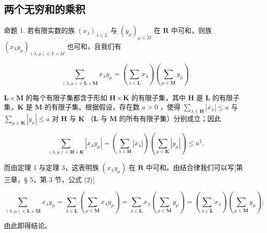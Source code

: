 \subsection{两个无穷和的乘积}

命题 1. 若有限实数的族 \((x_{\lambda})_{\lambda \in L}\) 与 \((y_{\mu})_{\mu \in M}\) 在 \(\mathbf{R}\) 中可和，则族 \((x_{\lambda}y_{\mu})_{(\lambda ,\mu)\in L\times M}\) 也可和，且我们有

\[
\sum_ {(\lambda , \mu) \in \mathbf {L} \times \mathbf {M}} x _ {\lambda} y _ {\mu} = (\sum_ {\lambda \in \mathbf {L}} x _ {\lambda}) (\sum_ {\mu \in \mathbf {M}} y _ {\mu}).\tag{1}
\]

\(\mathbf{L} \times \mathbf{M}\) 的每个有限子集都含于形如 \(\mathbf{H} \times \mathbf{K}\) 的有限子集，其中 \(\mathbf{H}\) 是 \(\mathbf{L}\) 的有限子集，\(\mathbf{K}\) 是 \(\mathbf{M}\) 的有限子集。根据假设，存在数 \(a > 0\) ，使得 \(\sum_{\lambda \in \mathbf{H}} |x_{\lambda}| \leqslant a\) 与 \(\sum_{\mu \in \mathbf{K}} |y_{\mu}| \leqslant a\) 对 \(\mathbf{H}\) 与 \(\mathbf{K}\) （\(\mathbf{L}\) 与 \(\mathbf{M}\) 的所有有限子集）分别成立；因此

\[
\sum_ {(\lambda , \mu) \in \mathbf {H} \times \mathbf {K}} | x _ {\lambda} y _ {\mu} | = (\sum_ {\lambda \in \mathbf {H}} | x _ {\lambda} |) (\sum_ {\mu \in \mathbf {K}} | y _ {\mu} |) \leqslant a ^ {2},
\]

而由定理 1 与定理 3，这表明族 \((x_{\lambda}y_{\mu})\) 在 \(\mathbf{R}\) 中可和。由结合律我们可以写{[}第三章，§ 5，第 3 节，公式 (2){]}

\[
\sum_ {(\lambda , \mu) \in \mathbf {L} \times \mathbf {M}} x _ {\lambda} y _ {\mu} = \sum_ {\lambda \in \mathbf {L}} (\sum_ {\mu \in \mathbf {M}} x _ {\lambda} y _ {\mu}) = \sum_ {\lambda \in \mathbf {L}} x _ {\lambda} (\sum_ {\mu \in \mathbf {M}} y _ {\mu}) = (\sum_ {\lambda \in \mathbf {L}} x _ {\lambda}) (\sum_ {\mu \in \mathbf {M}} y _ {\mu});
\]

由此即得结论。

